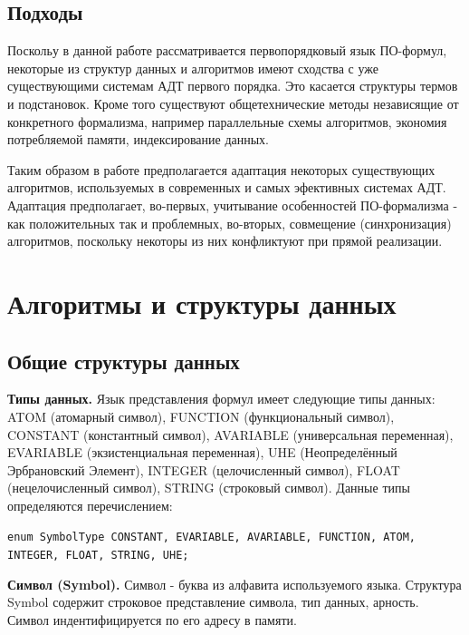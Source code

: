 \subsection{Подходы}
Поскольу в данной работе рассматривается первопорядковый язык ПО-формул, некоторые из структур данных и алгоритмов имеют сходства с уже существующими системам АДТ первого порядка. Это касается структуры термов и подстановок. Кроме того существуют общетехнические методы независящие от конкретного формализма, например параллельные схемы алгоритмов, экономия потребляемой памяти, индексирование данных.

Таким образом в работе предполагается адаптация некоторых существующих алгоритмов, используемых в современных и самых эфективных системах АДТ. Адаптация предполагает, во-первых, учитывание особенностей ПО-формализма - как положительных так и проблемных, во-вторых, совмещение (синхронизация) алгоритмов, поскольку некоторы из них конфликтуют при прямой реализации.



\section{Алгоритмы и структуры данных}

\subsection{Общие структуры данных}

\textbf{Типы данных.} Язык представления формул имеет следующие типы данных: ATOM (атомарный символ), FUNCTION (функциональный символ), CONSTANT (константный символ), AVARIABLE (универсальная переменная), EVARIABLE (экзистенциальная переменная), UHE (Неопределённый Эрбрановский Элемент), INTEGER (целочисленный символ), FLOAT (нецелочисленный символ), STRING (строковый символ). Данные типы определяются перечислением:

{\tt enum SymbolType {CONSTANT, EVARIABLE, AVARIABLE, FUNCTION, ATOM, INTEGER, FLOAT, STRING, UHE};}


\textbf{Символ (Symbol).} Символ - буква из алфавита используемого языка. Структура Symbol содержит строковое представление символа, тип данных, арность. Символ индентифицируется по его адресу в памяти.

